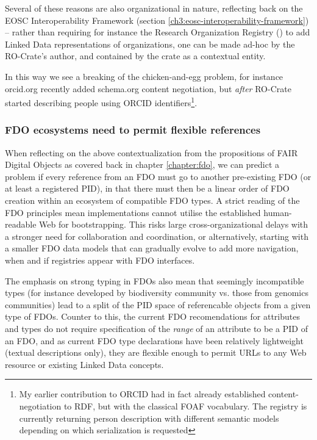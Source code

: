 Several of these reasons are also organizational in nature, reflecting back on the EOSC Interoperability Framework (section \vref{ch3:eosc-interoperability-framework}) -- rather than requiring for instance the Research Organization Registry () to add Linked Data representations of organizations, one can be made ad-hoc by the RO-Crate's author, and contained by the crate as a contextual entity. 

In this way we see a breaking of the chicken-and-egg problem, for instance orcid.org recently added schema.org content negotiation, but \emph{after} RO-Crate started describing people using ORCID identifiers\footnote{My earlier contribution to ORCID had in fact already established content-negotiation to RDF, but with the classical FOAF vocabulary. The registry is 
currently returning person description with different semantic models depending on which serialization is requested}. 


\subsubsection{FDO ecosystems need to permit flexible references}

When reflecting on the above contextualization from the propositions of FAIR Digital Objects as covered back in chapter \ref{chapter:fdo}, we can predict a problem if every reference from an FDO must go to another pre-existing FDO (or at least a registered PID), in that there must then be a linear order of FDO creation within an ecosystem of compatible FDO types. A strict reading of the FDO principles mean implementations cannot utilise the established human-readable Web for bootstrapping. This risks large cross-organizational delays with a stronger need for collaboration and coordination, or alternatively, starting with a smaller FDO data models that can gradually evolve to add more navigation, when and if registries appear with FDO interfaces. 

The emphasis on strong typing in FDOs also mean that seemingly incompatible types (for instance developed by biodiversity community vs. those from genomics communities) lead to a split of the PID space of referencable objects from a given type of FDOs.  Counter to this, the current FDO recomendations for attributes and types \cite{fdo-ImplAttributesTypesProfiles} do not require specification of the \emph{range} of an attribute to be a PID of an FDO, and as current FDO type declarations have been relatively lightweight (textual descriptions only), they are flexible enough to permit URLs to any Web resource or existing Linked Data concepts.  

